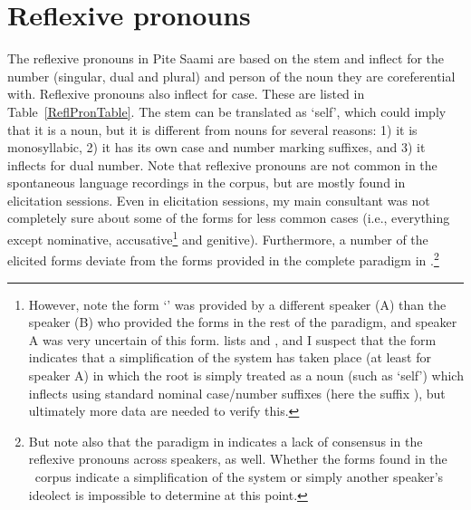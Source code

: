 \FB



\section{Reflexive pronouns}\label{reflexivePronouns}
The reflexive pronouns in Pite Saami are based on the stem  and inflect for the number (singular, dual and plural) and person of the noun they are coreferential with. Reflexive pronouns also inflect for case. These are listed in Table~\vref{ReflPronTable}. 
The stem  can be translated as ‘self’, which could imply that it is a noun, but it is different from nouns for several reasons: 1) it is monosyllabic, 2) it has its own case and number marking suffixes, and 3) it inflects for dual number. %
Note that reflexive pronouns are not common in the spontaneous language recordings in the corpus, but are mostly found in elicitation sessions. Even in elicitation sessions, my main consultant was not completely sure about some of the forms for less common cases (i.e., everything except nominative, accusative\footnote{However, note the form  ‘’ was provided by a different speaker (A) than the speaker (B) who provided the forms in the rest of the paradigm, and speaker A was very uncertain of this form. \citet[162]{Lehtiranta1992} lists  and , and I suspect that the form  indicates that a simplification of the system has taken place (at least for speaker A) in which the root  is simply treated as a noun (such as ‘self’) which inflects using standard nominal case/number suffixes (here the  suffix ), but ultimately more data are needed to verify this.} 
and genitive). Furthermore, a number of the elicited forms deviate from the forms provided in the complete paradigm in \citet[162]{Lehtiranta1992}.\footnote{But note also that the paradigm in \citet[162]{Lehtiranta1992} indicates a lack of consensus in the reflexive pronouns across speakers, as well. Whether the forms found in the \PSDP\ corpus indicate a simplification of the system or simply another speaker’s ideolect is impossible to determine at this point.}

